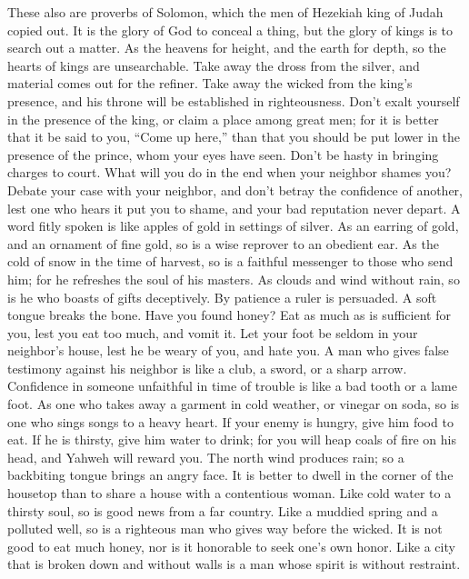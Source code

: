  These also are proverbs of Solomon, which the men of
Hezekiah king of Judah copied out.  It is the glory of God
to conceal a thing, but the glory of kings is to search out a matter.
 As the heavens for height, and the earth for depth, so
the hearts of kings are unsearchable.  Take away the dross
from the silver, and material comes out for the refiner. 
Take away the wicked from the king's presence, and his throne will be
established in righteousness.  Don't exalt yourself in the
presence of the king, or claim a place among great men; 
for it is better that it be said to you, ``Come up here,'' than that you
should be put lower in the presence of the prince, whom your eyes have
seen.  Don't be hasty in bringing charges to court. What
will you do in the end when your neighbor shames you? 
Debate your case with your neighbor, and don't betray the confidence of
another,  lest one who hears it put you to shame, and
your bad reputation never depart.  A word fitly spoken is
like apples of gold in settings of silver.  As an earring
of gold, and an ornament of fine gold, so is a wise reprover to an
obedient ear.  As the cold of snow in the time of
harvest, so is a faithful messenger to those who send him; for he
refreshes the soul of his masters.  As clouds and wind
without rain, so is he who boasts of gifts deceptively. 
By patience a ruler is persuaded. A soft tongue breaks the bone.
 Have you found honey? Eat as much as is sufficient for
you, lest you eat too much, and vomit it.  Let your foot
be seldom in your neighbor's house, lest he be weary of you, and hate
you.  A man who gives false testimony against his
neighbor is like a club, a sword, or a sharp arrow. 
Confidence in someone unfaithful in time of trouble is like a bad tooth
or a lame foot.  As one who takes away a garment in cold
weather, or vinegar on soda, so is one who sings songs to a heavy heart.
 If your enemy is hungry, give him food to eat. If he is
thirsty, give him water to drink;  for you will heap
coals of fire on his head, and Yahweh will reward you. 
The north wind produces rain; so a backbiting tongue brings an angry
face.  It is better to dwell in the corner of the
housetop than to share a house with a contentious woman. 
Like cold water to a thirsty soul, so is good news from a far country.
 Like a muddied spring and a polluted well, so is a
righteous man who gives way before the wicked.  It is not
good to eat much honey, nor is it honorable to seek one's own honor.
 Like a city that is broken down and without walls is a
man whose spirit is without restraint.

